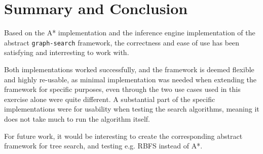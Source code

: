 \section{Summary and Conclusion}

Based on the A* implementation and the inference engine implementation of the abstract \texttt{graph-search} framework, the correctness and ease of use has been satisfying and interresting to work with. 

Both implementations worked successfully, and the framework is deemed flexible and highly re-usable, as minimal implementation was needed when extending the framework for specific purposes, even through the two use cases used in this exercise alone were quite different. A substantial part of the specific implementations were for usability when testing the search algorithms, meaning it does not take much to run the algorithm itself.

For future work, it would be interesting to create the corresponding abstract framework for tree search, and testing e.g. RBFS instead of A*.
